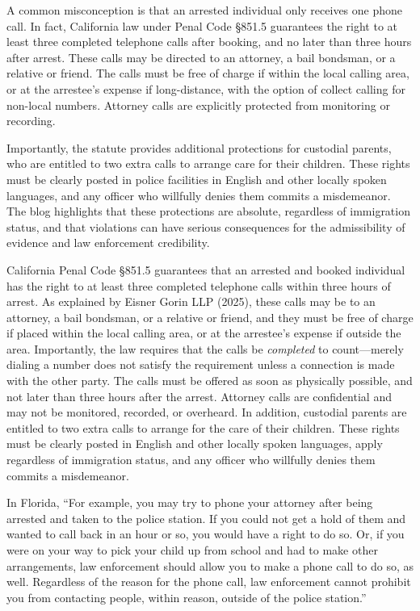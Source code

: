 \documentclass[12pt, a4paper]{article}
\begin{document}
A common misconception is that an arrested individual only receives one phone call. In fact, California law under Penal Code \S 851.5 guarantees the right to at least three completed telephone calls after booking, and no later than three hours after arrest. These calls may be directed to an attorney, a bail bondsman, or a relative or friend. The calls must be free of charge if within the local calling area, or at the arrestee's expense if long-distance, with the option of collect calling for non-local numbers. Attorney calls are explicitly protected from monitoring or recording. 

Importantly, the statute provides additional protections for custodial parents, who are entitled to two extra calls to arrange care for their children. These rights must be clearly posted in police facilities in English and other locally spoken languages, and any officer who willfully denies them commits a misdemeanor. The blog highlights that these protections are absolute, regardless of immigration status, and that violations can have serious consequences for the admissibility of evidence and law enforcement credibility.

California Penal Code \S 851.5 guarantees that an arrested and booked individual has the right to at least three completed telephone calls within three hours of arrest. As explained by Eisner Gorin LLP (2025), these calls may be to an attorney, a bail bondsman, or a relative or friend, and they must be free of charge if placed within the local calling area, or at the arrestee’s expense if outside the area. Importantly, the law requires that the calls be \textit{completed} to count—merely dialing a number does not satisfy the requirement unless a connection is made with the other party. The calls must be offered as soon as physically possible, and not later than three hours after the arrest. Attorney calls are confidential and may not be monitored, recorded, or overheard. In addition, custodial parents are entitled to two extra calls to arrange for the care of their children. These rights must be clearly posted in English and other locally spoken languages, apply regardless of immigration status, and any officer who willfully denies them commits a misdemeanor.

In Florida, ``For example, you may try to phone your attorney after being arrested and taken to the police station. If you could not get a hold of them and wanted to call back in an hour or so, you would have a right to do so. Or, if you were on your way to pick your child up from school and had to make other arrangements, law enforcement should allow you to make a phone call to do so, as well. Regardless of the reason for the phone call, law enforcement cannot prohibit you from contacting people, within reason, outside of the police station.''
\end{document}

